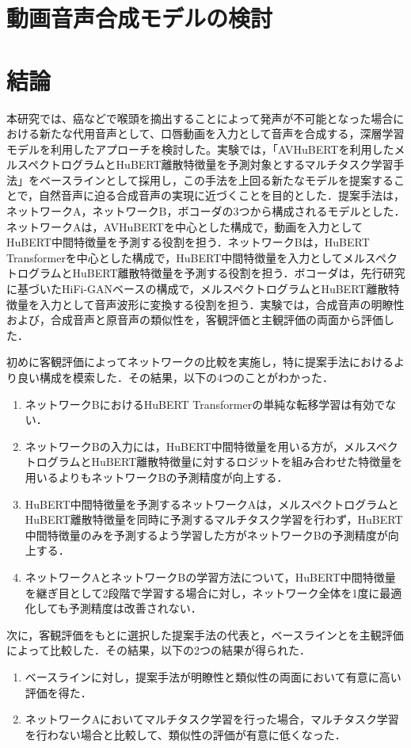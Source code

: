 \documentclass[12pt]{jarticle}
\numberwithin{equation}{section}    %
\numberwithin{figure}{section}      %
\numberwithin{table}{section}      %
\begin{document}
\clearpage

\section{動画音声合成モデルの検討}





\clearpage

\section{結論}
本研究では、癌などで喉頭を摘出することによって発声が不可能となった場合における新たな代用音声として、口唇動画を入力として音声を合成する，深層学習モデルを利用したアプローチを検討した。実験では，「AVHuBERTを利用したメルスペクトログラムとHuBERT離散特徴量を予測対象とするマルチタスク学習手法」をベースラインとして採用し，この手法を上回る新たなモデルを提案することで，自然音声に迫る合成音声の実現に近づくことを目的とした．提案手法は，ネットワークA，ネットワークB，ボコーダの3つから構成されるモデルとした．ネットワークAは，AVHuBERTを中心とした構成で，動画を入力としてHuBERT中間特徴量を予測する役割を担う．ネットワークBは，HuBERT Transformerを中心とした構成で，HuBERT中間特徴量を入力としてメルスペクトログラムとHuBERT離散特徴量を予測する役割を担う．ボコーダは，先行研究に基づいたHiFi-GANベースの構成で，メルスペクトログラムとHuBERT離散特徴量を入力として音声波形に変換する役割を担う．実験では，合成音声の明瞭性および，合成音声と原音声の類似性を，客観評価と主観評価の両面から評価した．

初めに客観評価によってネットワークの比較を実施し，特に提案手法におけるより良い構成を模索した．その結果，以下の4つのことがわかった．
\begin{enumerate}
    \item ネットワークBにおけるHuBERT Transformerの単純な転移学習は有効でない．
    \item ネットワークBの入力には，HuBERT中間特徴量を用いる方が，メルスペクトログラムとHuBERT離散特徴量に対するロジットを組み合わせた特徴量を用いるよりもネットワークBの予測精度が向上する．
    \item HuBERT中間特徴量を予測するネットワークAは，メルスペクトログラムとHuBERT離散特徴量を同時に予測するマルチタスク学習を行わず，HuBERT中間特徴量のみを予測するよう学習した方がネットワークBの予測精度が向上する．
    \item ネットワークAとネットワークBの学習方法について，HuBERT中間特徴量を継ぎ目として2段階で学習する場合に対し，ネットワーク全体を1度に最適化しても予測精度は改善されない．
\end{enumerate}
次に，客観評価をもとに選択した提案手法の代表と，ベースラインとを主観評価によって比較した．その結果，以下の2つの結果が得られた．
\begin{enumerate}
    \item ベースラインに対し，提案手法が明瞭性と類似性の両面において有意に高い評価を得た．
    \item ネットワークAにおいてマルチタスク学習を行った場合，マルチタスク学習を行わない場合と比較して、類似性の評価が有意に低くなった．
\end{enumerate}
\end{document}

